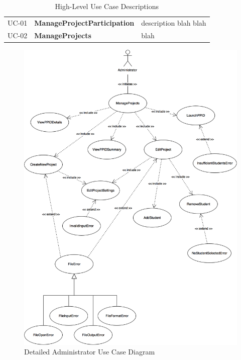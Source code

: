 \documentclass[12pt,letterpaper]{article}
\begin{document}
\begin{table}[H]
	\caption{High-Level Use Case Descriptions}
	\begin{tabu} to 
		UC-01 & ManageProjectParticipation & description blah blah \\
		UC-02 & ManageProjects & blah \\
	\end{tabu}
\end{table}

\begin{figure}[H]
	\centering{}
	\includegraphics[scale=0.23]{imgs/detailed-administrator-use-case-diagram.png}
	\caption{Detailed Administrator Use Case Diagram}
\end{figure}
\end{document}
